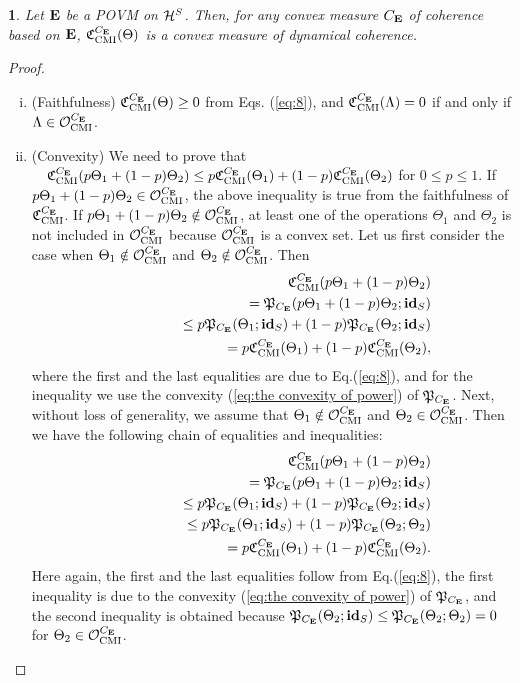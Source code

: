 \documentclass[american,aps,pra,reprint, superscriptaddress]{revtex4-1}
\def\bea{\begin{eqnarray*}}
\def\eea{\end{eqnarray*}}
\theoremstyle{plain}
\newtheorem{thrm}{\protect\theoremname}
\providecommand{\theoremname}{Theorem}
\newcommand{\id}{\mathbf{id}}
\newcommand{\ids}[1]{\id_{#1}}
\def\mCMI{\textmd{CMI}} \def\mI{\textmd{I}} \def\mPI{\textmd{PI}}
\def\fC{\mathfrak{C}}\def\fD{\mathfrak{D}}\def\fF{\mathfrak{F}}\def\fP{\mathfrak{P}}
\theoremstyle{definition}
\theoremstyle{remark}
\begin{document}
\begin{thrm}\label{th:1}
Let $\mathbf{E}$ be a POVM on $\mathcal{H}^{S}$. Then, for any convex measure $C_{\mathbf{E}}$ of coherence based on $\mathbf{E}$, $\fC_{\mCMI}^{C_\bE}(\Theta)$ is a convex measure of dynamical coherence.
\end{thrm}
\begin{proof}
\begin{enumerate}[(i)]
  \item (Faithfulness) $\fC_{\mCMI}^{C_\bE}(\Theta) \geq 0$ from Eqs. (\ref{eq:8}), and $\fC_{\mCMI}^{C_\bE}(\Lambda) = 0$ if and only if $\Lambda\in \cO_{\mCMI}^{C_\bE}$.

  \item (Convexity) We need to prove that $\quad \fC_{\mCMI}^{C_\bE}(p\Theta_1+(1-p)\Theta_2) \leq p\fC_{\mCMI}^{C_\bE}(\Theta_1)+(1-p)\fC_{\mCMI}^{C_\bE}(\Theta_2)$
  for $0\leq p \leq1$. If $p\Theta_1+(1-p)\Theta_2 \in \cO_{\mCMI}^{C_\bE}$, the above inequality is true from the faithfulness of $\fC_{\mCMI}^{C_\bE}$. If $p\Theta_1+(1-p)\Theta_2 \notin \cO_{\mCMI}^{C_\bE}$, at least one of the operations $\Theta_1$ and $\Theta_2$ is not included in $\cO_{\mCMI}^{C_\bE}$ because $\cO_{\mCMI}^{C_\bE}$ is a convex set. Let us first consider the case when $\Theta_1\notin \cO_{\mCMI}^{C_\bE}$ and $\Theta_2\notin \cO_{\mCMI}^{C_\bE}$. Then
  \bea
&&\quad \fC_{\mCMI}^{C_\bE}(p\Theta_1+(1-p)\Theta_2)\\
  &&\qquad\qquad =\fP_{C_\bE}(p\Theta_1+(1-p)\Theta_2;\ids{S})\\
  &&\qquad\qquad \leq p\fP_{C_\bE}(\Theta_1;\ids{S}) + (1-p)\fP_{C_\bE}(\Theta_2;\ids{S})\\
  &&\qquad\qquad = p\fC_{\mCMI}^{C_\bE}(\Theta_1)+(1-p)\fC_{\mCMI}^{C_\bE}(\Theta_2),
\eea
where the first and the last equalities are due to Eq.(\ref{eq:8}), and for the inequality we use the convexity (\ref{eq:the convexity of power}) of $\fP_{C_\bE}$.
Next, without loss of generality, we assume that $\Theta_1\notin \cO_{\mCMI}^{C_\bE}$ and $\Theta_2\in \cO_{\mCMI}^{C_\bE}$. Then we have the following chain of equalities and inequalities:
\bea
  &&\quad\fC_{\mCMI}^{C_\bE}(p\Theta_1+(1-p)\Theta_2)\\
  &&\qquad\qquad =\fP_{C_\bE}(p\Theta_1+(1-p)\Theta_2;\ids{S})\\
  &&\qquad\qquad \leq p\fP_{C_\bE}(\Theta_1;\ids{S}) + (1-p)\fP_{C_\bE}(\Theta_2;\ids{S})\\
  &&\qquad\qquad \leq p\fP_{C_\bE}(\Theta_1;\ids{S}) + (1-p)\fP_{C_\bE}(\Theta_2; \Theta_2)\\
  &&\qquad\qquad =p\fC_{\mCMI}^{C_\bE}(\Theta_1)+(1-p)\fC_{\mCMI}^{C_\bE}(\Theta_2).
\eea
Here again, the first and the last equalities follow from Eq.(\ref{eq:8}), the first inequality is due to the convexity (\ref{eq:the convexity of power}) of $\fP_{C_\bE}$, and the second inequality is obtained because $\fP_{C_\bE}(\Theta_2;\ids{S}) \leq \fP_{C_\bE}(\Theta_2; \Theta_2) = 0$ for $\Theta_2 \in \cO_{\mCMI}^{C_\bE}$.


\end{enumerate}
\end{proof}
\end{document}
